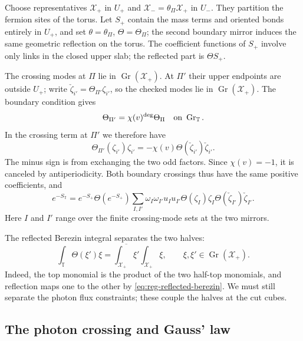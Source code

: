 Choose representatives $\mathcal X_+$ in $U_+$ and
$\mathcal X_-=\theta_\Pi\mathcal X_+$ in $U_-$. They partition the
fermion sites of the torus. Let $S_+$ contain the mass terms and
oriented bonds entirely in $U_+$, and set
$\theta=\theta_\Pi$, $\Theta=\Theta_\Pi$; the second boundary mirror
induces the same geometric reflection on the torus.
The coefficient functions of $S_+$ involve only links in the closed
upper slab; the reflected part is $\Theta S_+$.

The crossing modes at $\Pi$ lie in
$\operatorname{Gr}(\mathcal X_+)$. At $\Pi'$ their upper endpoints
are outside $U_+$; write
$\check\zeta_{i'}=\Theta_{\Pi'}\zeta_{i'}$, so the checked modes
lie in $\operatorname{Gr}(\mathcal X_+)$. The boundary condition gives
\begin{equation}\label{eq:reg-second-reflection}
 \Theta_{\Pi'}=\chi(v)^{\deg}\Theta_\Pi
                 \quad\hbox{on }\operatorname{Gr}_{\mathbb T}.
\end{equation}
In the crossing term at $\Pi'$ we therefore have
\[
 \Theta_{\Pi'}(\zeta_{i'})\zeta_{i'}
 =-\chi(v)\Theta(\check\zeta_{i'})\check\zeta_{i'}.
\]
The minus sign is from exchanging the two odd factors. Since
$\chi(v)=-1$, it is canceled by antiperiodicity. Both boundary
crossings thus have the same positive coefficients, and
\begin{equation}\label{eq:reg-two-crossings}
 e^{-S_{\mathbb T}}=e^{-S_+}\Theta(e^{-S_+})
 \sum_{I,I'}\omega_I\omega_{I'}u_Iu_{I'}
       \Theta(\zeta_I)\zeta_I
       \Theta(\check\zeta_{I'})\check\zeta_{I'}.
\end{equation}
Here $I$ and $I'$ range over the finite crossing-mode sets at the
two mirrors.

The reflected Berezin integral separates the two halves:
\begin{equation}\label{eq:reg-half-berezin}
 \int_{\mathbb T}\Theta(\xi')\xi
 =\overline{\int_{\mathcal X_+}\xi'}
                  \int_{\mathcal X_+}\xi,
 \qquad \xi,\xi'\in\operatorname{Gr}(\mathcal X_+).
\end{equation}
Indeed, the top monomial is the product of the two half-top
monomials, and reflection maps one to the other by
\eqref{eq:reg-reflected-berezin}. We must still separate the photon
flux constraints; these couple the halves at the cut cubes.

\subsection{The photon crossing and Gauss' law}\label{subsec:reg-gauss}

